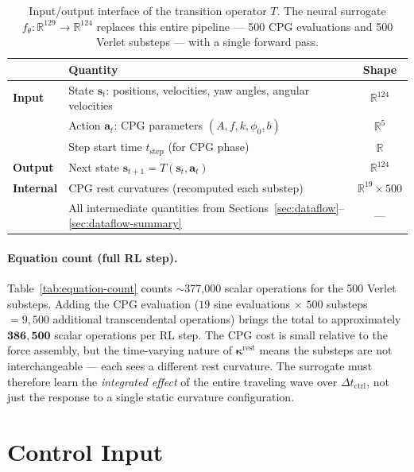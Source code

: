\documentclass[11pt]{article}
\newcommand{\vect}[1]{\mathbf{#1}}
\newcommand{\Real}{\mathbb{R}}
\begin{document}
\begin{table}[H]
  \centering
  \renewcommand{\arraystretch}{1.3}
  \begin{tabular}{lp{9cm}c}
    \toprule
    & \textbf{Quantity} & \textbf{Shape} \\
    \midrule
    \textbf{Input}
      & State $\vect{s}_t$: positions, velocities, yaw angles, angular velocities & $\Real^{124}$ \\
      & Action $\vect{a}_t$: CPG parameters $(A, f, k, \phi_0, b)$ & $\Real^{5}$ \\
      & Step start time $t_{\text{step}}$ (for CPG phase) & $\Real$ \\
    \midrule
    \textbf{Output}
      & Next state $\vect{s}_{t+1} = T(\vect{s}_t, \vect{a}_t)$ & $\Real^{124}$ \\
    \midrule
    \textbf{Internal}
      & CPG rest curvatures (recomputed each substep) & $\Real^{19} \times 500$ \\
      & All intermediate quantities from Sections~\ref{sec:dataflow}--\ref{sec:dataflow-summary} & --- \\
    \bottomrule
  \end{tabular}
  \caption{Input/output interface of the transition operator $T$.
    The neural surrogate $f_\theta\colon \Real^{129} \to \Real^{124}$ replaces
    this entire pipeline --- 500 CPG evaluations and 500 Verlet substeps ---
    with a single forward pass.}
  \label{tab:transition-io}
\end{table}

\paragraph{Equation count (full RL step).}
Table~\ref{tab:equation-count} counts $\sim$377{,}000 scalar operations for the 500 Verlet substeps.
Adding the CPG evaluation ($19$ sine evaluations $\times$ $500$ substeps $= 9{,}500$ additional transcendental operations) brings the total to approximately $\mathbf{386{,}500}$ scalar operations per RL step.
The CPG cost is small relative to the force assembly, but the time-varying nature of $\bm{\kappa}^{\text{rest}}$ means the substeps are not interchangeable --- each sees a different rest curvature.
The surrogate must therefore learn the \emph{integrated effect} of the entire traveling wave over $\Delta t_{\text{ctrl}}$, not just the response to a single static curvature configuration.

\section{Control Input}
\label{sec:control}
\end{document}
